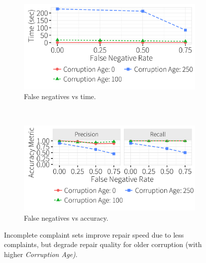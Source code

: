     
\begin{figure}[t]
  \hspace*{-.1in}
  \centering
    \begin{subfigure}[t]{.33\textwidth}
      \includegraphics[width = .99\columnwidth]{figures/noise_fn_time_fulllabel} 
      \vspace*{-.1in}
      \caption{False negatives vs time.}
      \label{f:falsenegative_time} 
    \end{subfigure}
    \\
    \begin{subfigure}[t]{.33\textwidth}
      \includegraphics[width = .99\columnwidth]{figures/noise_fn_acc_fulllabel}
      \vspace*{-.1in}
      \caption{False negatives vs accuracy.}
      \label{f:falsenegative_acc} 
    \end{subfigure}
    \vspace*{-.1in}
    \caption{Incomplete complaint sets improve repair speed due to less complaints, but degrade repair quality for older corruption (with higher \textit{Corruption Age)}. }
     \label{f:falsenegative} 
     \vspace{-2mm}
  \end{figure}



